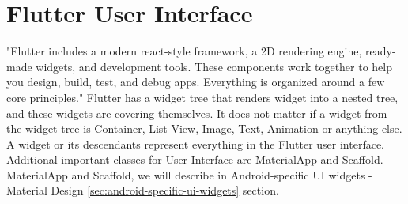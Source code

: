 \section{Flutter User Interface}\label{subsec:flutter-user-interface}
"Flutter includes a modern react-style framework, a 2D rendering engine, ready-made widgets, and development tools.
These components work together to help you design, build, test, and debug apps.
Everything is organized around a few core principles."\cite{flutterTechnicalOverview}
Flutter has a widget tree that renders widget into a nested tree, and these widgets are covering themselves.
It does not matter if a widget from the widget tree is Container, List View, Image, Text, Animation or anything else.
A widget or its descendants represent everything in the Flutter user interface.
Additional important classes for User Interface are MaterialApp and Scaffold.
MaterialApp and Scaffold, we will describe in Android-specific UI widgets - Material Design \ref{sec:android-specific-ui-widgets} section.
